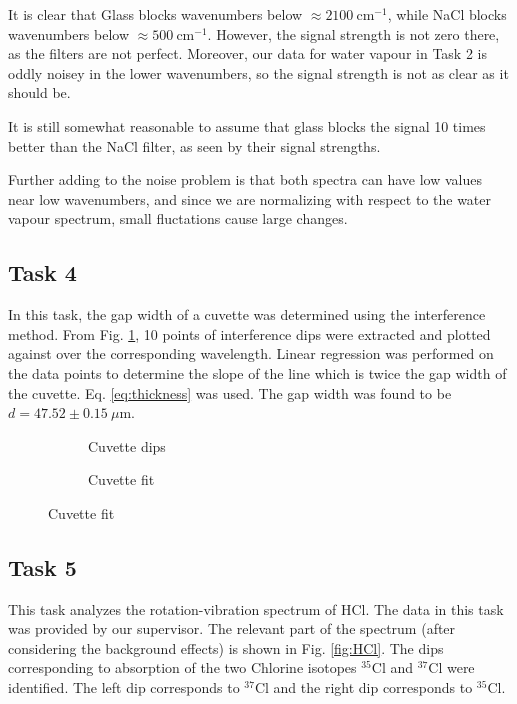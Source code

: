 \documentclass{article}
\begin{document}
It is clear that Glass blocks wavenumbers below $\approx 2100 \ \text{cm}^{-1}$, while NaCl blocks wavenumbers below $\approx 500 \ \text{cm}^{-1}$. However, the signal strength is not zero there, as the filters are not perfect.
Moreover, our data for water vapour in Task 2 is oddly noisey in the lower wavenumbers, so the signal strength is not as clear as it should be.  

It is still somewhat reasonable to assume that glass blocks the signal 10 times better than the NaCl filter, as seen by their signal strengths.

Further adding to the noise problem is that both spectra can have low values near low wavenumbers, and since we are normalizing with respect to the water vapour spectrum, small fluctations cause large changes.

\pagebreak{}

\subsection{Task 4}

In this task, the gap width of a cuvette was determined using the interference method. From Fig. \ref{fig:Cuvette dips}, 10 points of interference dips were extracted and plotted against over the corresponding wavelength. Linear regression was performed on the data points to determine the slope of the line which is twice the gap width of the cuvette. Eq. \ref{eq:thickness} was used. The gap width was found to be $d = 47.52 \pm 0.15 \ \mu$m.

\begin{figure}[h!]
	\centering
	\begin{subfigure}{0.45\textwidth}
		\centering
		\scalebox{0.50}{}
		\caption{Cuvette dips}
		\label{fig:Cuvette dips}
	\end{subfigure}
	\hspace{0.5cm}
	\begin{subfigure}{0.45\textwidth}
		\centering
		\scalebox{0.50}{}
		\caption{Cuvette fit}
		\label{fig:Cuvette_fit}
	\end{subfigure}
\end{figure}

\subsection{Task 5}

This task analyzes the rotation-vibration spectrum of HCl. The data in this task was provided by our supervisor. The relevant part of the spectrum (after considering the background effects) is shown in Fig. \ref{fig:HCl}. The dips corresponding to absorption of the two Chlorine isotopes $^{35}$Cl and $^{37}$Cl were identified. The left dip corresponds to $^{37}$Cl and the right dip corresponds to $^{35}$Cl.
\end{document}

